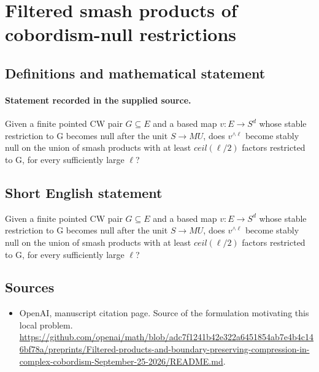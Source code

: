 \documentclass[11pt]{article}
\begin{document}
\section*{Filtered smash products of cobordism-null restrictions}\label{30007306}
\subsection{Definitions and mathematical statement}
\paragraph{Statement recorded in the supplied source.}
Given a finite pointed CW pair $G\subseteq E$ and a based map $v:E\to S^d$ whose stable restriction to G becomes null after the unit $S\to MU$, does $v^{\wedge \ell }$ become stably null on the union of smash products with at least $ceil(\ell /2)$ factors restricted to G, for every sufficiently large $\ell $?
\subsection{Short English statement}
Given a finite pointed CW pair $G\subseteq E$ and a based map $v:E\to S^d$ whose stable restriction to G becomes null after the unit $S\to MU$, does $v^{\wedge \ell }$ become stably null on the union of smash products with at least $ceil(\ell /2)$ factors restricted to G, for every sufficiently large $\ell $?
\subsection{Sources}
\begin{itemize}
\item[S1] OpenAI, manuscript citation page. Source of the formulation motivating this local problem.
\url{https://github.com/openai/math/blob/adc7f1241b42e322a6451854ab7e4b4c146bf78a/preprints/Filtered-products-and-boundary-preserving-compression-in-complex-cobordism-September-25-2026/README.md}.
\end{itemize}
\end{document}
